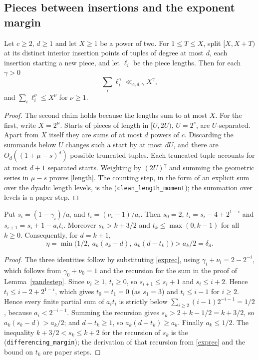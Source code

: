 \documentclass[11pt]{article}
\begin{document}
\subsection{Pieces between insertions and the exponent margin}
\begin{lemma}\label{piecelemma}
Let \(c\ge2\), \(d\ge1\) and let \(X\ge1\) be a power of two. For
\(1\le T\le X\), split \([X,X+T)\) at its distinct interior insertion
points of tuples of degree at most \(d\), each insertion starting a new
piece, and let \(\ell_i\) be the piece lengths. Then for each
\(\gamma>0\)
\begin{equation}\label{length}
 \sum_i \ell_i^\gamma\ll_{c,d,\gamma} X^\gamma,
\end{equation}
and \(\sum_i\ell_i^\nu\le X^\nu\) for \(\nu\ge1\).
\end{lemma}
\begin{proof}
The second claim holds because the lengths sum to at most \(X\). For the
first, write \(X=2^\mu\). Starts of pieces of length in \([U,2U)\),
\(U=2^s\), are \(U\)-separated. Apart from \(X\) itself they are sums of at
most \(d\) powers of \(c\). Discarding the summands below \(U\) changes such
a start by at most \(dU\), and there are \(O_d((1+\mu-s)^d)\) possible
truncated tuples. Each truncated tuple accounts for at most \(d+1\)
separated starts. Weighting by \((2U)^\gamma\) and summing the geometric
series in \(\mu-s\) proves \eqref{length}. The counting step, in the
form of an explicit sum over the dyadic length levels, is the
(\texttt{clean\_length\_moment}); the summation over levels is a paper
step.
\end{proof}

\begin{lemma}\label{marginlemma}
Put \(s_i=(1-\gamma_i)/a_i\) and \(t_i=(\nu_i-1)/a_i\). Then \(s_0=2\),
\(t_i=s_i-4+2^{1-i}\) and \(s_{i+1}=s_i+1-a_it_i\). Moreover
\(s_k>k+3/2\) and \(t_k\le\max(0,k-1)\) for all \(k\ge0\). Consequently,
for \(d=k+1\),
\[
 \eta=\min\bigl(1/2,\ a_k(s_k-d),\ a_k(d-t_k)\bigr)>a_k/2=\delta_d .
\]
\end{lemma}
\begin{proof}
The three identities follow by substituting \eqref{exprec}, using
\(\gamma_i+\nu_i=2-2^{-i}\), which follows from \(\gamma_0+\nu_0=1\) and the
recursion for the sum in the proof of Lemma~\ref{vandestep}. Since
\(\nu_i\ge1\), \(t_i\ge0\), so \(s_{i+1}\le s_i+1\) and \(s_i\le i+2\).
Hence \(t_i\le i-2+2^{1-i}\), which gives \(t_0=t_1=0\) (as \(s_1=3\)) and
\(t_i\le i-1\) for \(i\ge2\). Hence every finite partial sum of
\(a_it_i\) is strictly below \(\sum_{i\ge2}(i-1)2^{-i-1}=1/2\), because
\(a_i<2^{-i-1}\). Summing the recursion gives \(s_k>2+k-1/2=k+3/2\), so
\(a_k(s_k-d)>a_k/2\); and \(d-t_k\ge1\), so \(a_k(d-t_k)\ge a_k\). Finally
\(a_k\le1/2\). The inequality \(k+3/2<s_k\le k+2\) for the recursion of
\(s_k\) is the 
(\texttt{differencing\_margin}); the derivation of that recursion from
\eqref{exprec} and the bound on \(t_k\) are paper steps.
\end{proof}
\end{document}
